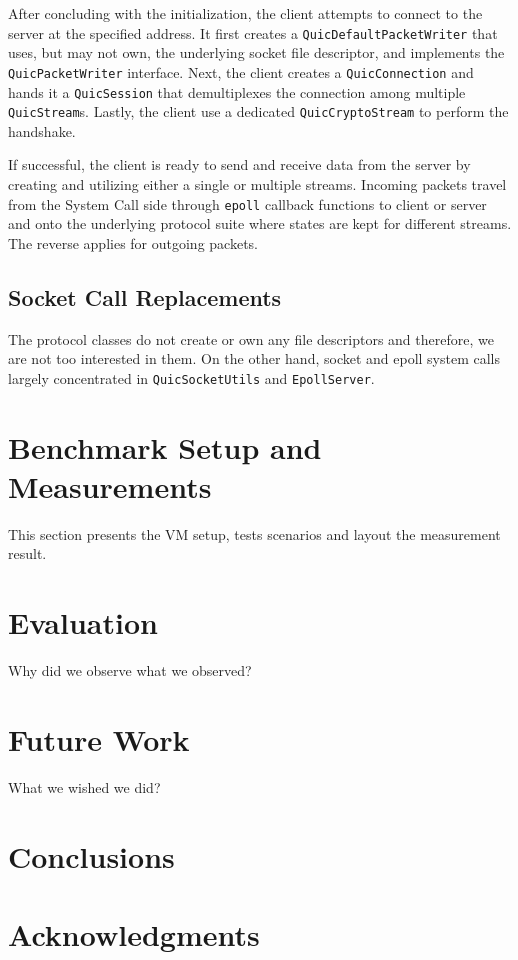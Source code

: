 \documentclass{sig-alternate-05-2015}
\begin{document}
After concluding with the initialization, the client attempts to connect to the server at the specified address. It first creates a                   \texttt{QuicDefaultPacketWriter} that uses, but may not own, the underlying socket file descriptor, and implements the \texttt{QuicPacketWriter} interface. Next, the client creates a \texttt{QuicConnection} and hands it a \texttt{QuicSession} that demultiplexes the connection among multiple \texttt{QuicStream}s. Lastly, the client use a dedicated \texttt{QuicCryptoStream} to perform the handshake.

If successful, the client is ready to send and receive data from the server by creating and utilizing either a single or multiple streams. Incoming packets travel from the System Call side through \texttt{epoll} callback functions to client or server and onto the underlying protocol suite where states are kept for different streams. The reverse applies for outgoing packets.

\subsection{Socket Call Replacements}
The protocol classes do not create or own any file descriptors and therefore, we are not too interested in them. On the other hand, socket and epoll system calls largely concentrated in \texttt{QuicSocketUtils} and \texttt{EpollServer}. 


\section{Benchmark Setup and Measurements}
This section presents the VM setup, tests scenarios and layout the measurement result.

\section{Evaluation}
Why did we observe what we observed?

\section{Future Work}
What we wished we did?

\section{Conclusions}

\section{Acknowledgments}




\end{document}
